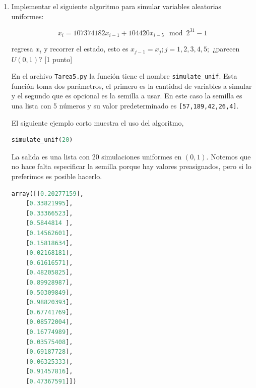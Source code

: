 \documentclass{article}
\begin{document}
\begin{enumerate}
\begin{proof}
        \begin{align*}
            x \ge F^-_X( F_X(x) ) \ge F_X^-(y).
        \end{align*}

        De las dos implicaciones anteriores tenemos que $\{(y,x) : F_X^-(y) \le x\} = \{ (y,x) : F_X(x) \ge y\}$.
        Sea $u\sim U(0,1)$

        \begin{align*}
            \P{ F_X^-(U) \le x } = \P{U \le F_X(x)} = F_X(x).
        \end{align*}

        Lo anterior se cumple para todo $x \in \R$. Como la función de distribución caracteriza
        la distribución, concluimos que $X \overset d{=} F_X^-(U)$.

    \end{proof}

    \item Implementar el siguiente algoritmo para simular variables aleatorias 
    uniformes:
    
    \[ x_i = 107374182x_{i-1} + 104420x_{i-5} \mod 2^{31} - 1\]
    
    regresa $x_i$ y recorrer el estado, esto es $x_{j-1} = x_j ; j = 1, 2, 3, 4, 5;$ 
    ¿parecen $U (0, 1)$? [1 punto]

    En el archivo \texttt{Tarea5.py} la función tiene el nombre \texttt{simulate\_unif}. Esta
    función toma dos parámetros, el primero es la cantidad de variables a simular y el segundo
    que es opcional es la semilla a usar. En este caso la semilla es una lista con 5 números y su
    valor predeterminado es \texttt{[57,189,42,26,4]}.

    El siguiente ejemplo corto muestra el uso del algoritmo,

    \begin{lstlisting}[language=Python]
simulate_unif(20)\end{lstlisting}

    La salida es una lista con 20 simulaciones uniformes en $(0,1)$. Notemos que no hace
    falta especificar la semilla porque hay valores preasignados, pero si lo preferimos 
    es posible hacerlo.

\begin{lstlisting}[language=Python]
array([[0.20277159],
    [0.33821995],
    [0.33366523],
    [0.5844814 ],
    [0.14562601],
    [0.15818634],
    [0.02168181],
    [0.61616571],
    [0.48205825],
    [0.89928987],
    [0.50309849],
    [0.98820393],
    [0.67741769],
    [0.08572004],
    [0.16774989],
    [0.03575408],
    [0.69187728],
    [0.06325333],
    [0.91457816],
    [0.47367591]])\end{lstlisting}


\end{enumerate}
\end{document}

